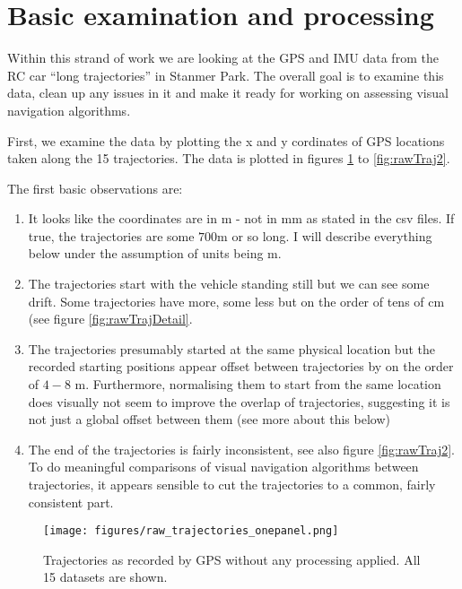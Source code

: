 \documentclass[a4]{article}
\begin{document}
\section{Basic examination and processing}
Within this strand of work we are looking at the GPS and IMU data from
the RC car ``long trajectories'' in Stanmer Park. The overall goal is to
examine this data, clean up any issues in it and make it ready for
working on assessing visual navigation algorithms.

First, we examine the data by plotting the x and y cordinates of GPS
locations taken along the 15 trajectories. The data is plotted in
figures \ref{fig:rawTraj1} to \ref{fig:rawTraj2}.

The first basic observations are:
\begin{enumerate}
  \item It looks like the coordinates are in m - not in mm as
    stated in the csv files. If true, the trajectories are some $700$m
    or so long. I will describe everything below under the assumption
    of units being m.
  \item The trajectories start with the vehicle standing still but we
    can see some drift. Some trajectories have more, some less but on
    the order of tens of cm (see figure \ref{fig:rawTrajDetail}.
  \item The trajectories presumably started at the same physical
    location but the recorded starting positions appear offset between
    trajectories by on the order of $4-8$ m. Furthermore, normalising
    them to start from the same location does visually not seem to
    improve the overlap of trajectories, suggesting it is not just a
    global offset between them (see more about this below)
  \item The end of the trajectories is fairly inconsistent, see also
    figure \ref{fig:rawTraj2}. To do meaningful comparisons of visual
    navigation algorithms between trajectories, it appears sensible to
    cut the trajectories to a 
    common, fairly consistent part.
\end{enumerate}

\begin{figure}\begin{center}
  \texttt{[image: figures/raw\_trajectories\_onepanel.png]}
  \caption{\label{fig:rawTraj1} Trajectories as recorded by GPS
    without any processing applied. All 15 datasets are shown.}
\end{center}\end{figure}
\end{document}
